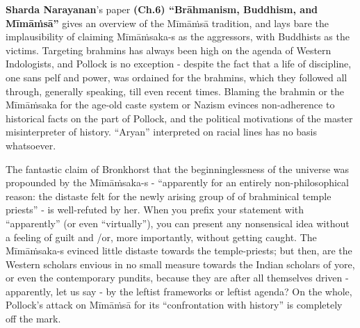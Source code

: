 \newpage

\textbf{Sharda Narayanan}’s paper \textbf{(Ch.6) “Brāhmanism, Buddhism, and Mīmāṁsā”} gives an overview of the Mīmāṁsā tradition, and lays bare the implausibility of claiming Mīmāṁsaka-s as the aggressors, with Buddhists as the victims. Targeting brahmins has always been high on the agenda of Western Indologists, and Pollock is no exception - despite the fact that a life of discipline, one sans pelf and power, was ordained for the brahmins, which they followed all through, generally speaking, till even recent times. Blaming the brahmin or the Mīmāṁsaka for the age-old caste system or Nazism evinces non-adherence to historical facts on the part of Pollock, and the political motivations of the master misinterpreter of history. “Aryan” interpreted on racial lines has no basis whatsoever.

The fantastic claim of Bronkhorst that the beginninglessness of the universe was propounded by the Mīmāṁsaka-s - “apparently for an entirely non-philosophical reason: the distaste felt for the newly arising group of of brahminical temple priests” - is well-refuted by her. When you prefix your statement with “apparently” (or even “virtually”), you can present any nonsensical idea without a feeling of guilt and /or, more importantly, without getting caught. The Mīmāṁsaka-s evinced little distaste towards the temple-priests; but then, are the Western scholars envious in no small measure towards the Indian scholars of yore, or even the contemporary pundits, because they are after all themselves driven - apparently, let us say - by the leftist frameworks or leftist agenda? On the whole, Pollock’s attack on Mīmāṁsā for its “confrontation with history” is completely off the mark.


